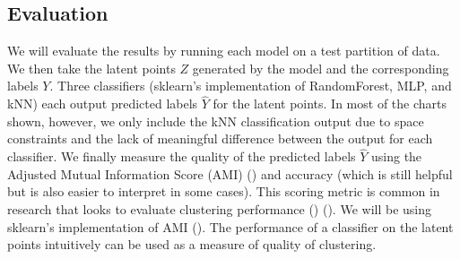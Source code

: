 \documentclass[./dissertation.tex]{subfiles}
\begin{document}
    \subsection{Evaluation}
    We will evaluate the results by running each model on a test partition of data. We then take the latent points $Z$ generated by the model and the corresponding labels $Y$. Three classifiers (sklearn's implementation of RandomForest, MLP, and kNN) each output predicted labels $\hat{Y}$ for the latent points. In most of the charts shown, however, we only include the kNN classification output due to space constraints and the lack of meaningful difference between the output for each classifier. We finally measure the quality of the predicted labels $\hat{Y}$ using the Adjusted Mutual Information Score (AMI) (\cite{vinh2010information}) and accuracy (which is still helpful but is also easier to interpret in some cases). This scoring metric is common in research that looks to evaluate clustering performance (\cite{zhu2021finding})  (\cite{emmons2016analysis}). We will be using sklearn's implementation of AMI (\cite{scikit-learn}). The performance of a classifier on the latent points intuitively can be used as a measure of quality of clustering.
\end{document}
